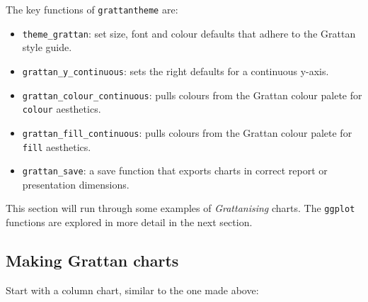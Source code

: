\documentclass[]{book}
\newenvironment{Shaded}{\begin{snugshade}}{\end{snugshade}}
\newcommand{\DataTypeTok}[1]{\textcolor[rgb]{0.13,0.29,0.53}{#1}}
\newcommand{\KeywordTok}[1]{\textcolor[rgb]{0.13,0.29,0.53}{\textbf{#1}}}
\newcommand{\NormalTok}[1]{#1}
\newcommand{\OperatorTok}[1]{\textcolor[rgb]{0.81,0.36,0.00}{\textbf{#1}}}
\newcommand{\StringTok}[1]{\textcolor[rgb]{0.31,0.60,0.02}{#1}}
\providecommand{\tightlist}{%
  \setlength{\itemsep}{0pt}\setlength{\parskip}{0pt}}
\begin{document}
The key functions of \texttt{grattantheme} are:

\begin{itemize}
\tightlist
\item
  \texttt{theme\_grattan}: set size, font and colour defaults that adhere to the Grattan style guide.
\item
  \texttt{grattan\_y\_continuous}: sets the right defaults for a continuous y-axis.
\item
  \texttt{grattan\_colour\_continuous}: pulls colours from the Grattan colour palete for \texttt{colour} aesthetics.
\item
  \texttt{grattan\_fill\_continuous}: pulls colours from the Grattan colour palete for \texttt{fill} aesthetics.
\item
  \texttt{grattan\_save}: a save function that exports charts in correct report or presentation dimensions.
\end{itemize}

This section will run through some examples of \emph{Grattanising} charts. The \texttt{ggplot} functions are explored in more detail in the next section.

\hypertarget{making-grattan-charts}{%
\subsection{Making Grattan charts}\label{making-grattan-charts}}

Start with a column chart, similar to the one made above:

\begin{Shaded}
\end{Shaded}
\end{document}
